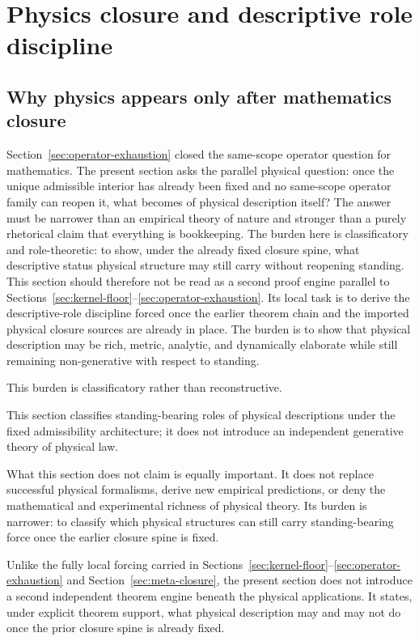 \section{Physics closure and descriptive role discipline}
\label{sec:physics-closure}

\subsection{Why physics appears only after mathematics closure}

Section~\ref{sec:operator-exhaustion} closed the same-scope operator question for mathematics. The present section asks the parallel physical question: once the unique admissible interior has already been fixed and no same-scope operator family can reopen it, what becomes of physical description itself? The answer must be narrower than an empirical theory of nature and stronger than a purely rhetorical claim that everything is bookkeeping. The burden here is classificatory and role-theoretic: to show, under the already fixed closure spine, what descriptive status physical structure may still carry without reopening standing. This section should therefore not be read as a second proof engine parallel to Sections~\ref{sec:kernel-floor}--\ref{sec:operator-exhaustion}. Its local task is to derive the descriptive-role discipline forced once the earlier theorem chain and the imported physical closure sources are already in place. The burden is to show that physical description may be rich, metric, analytic, and dynamically elaborate while still remaining non-generative with respect to standing.

This burden is classificatory rather than reconstructive.

This section classifies standing-bearing roles of physical descriptions under the fixed admissibility architecture; it does not introduce an independent generative theory of physical law.

What this section does not claim is equally important. It does not replace successful physical formalisms, derive new empirical predictions, or deny the mathematical and experimental richness of physical theory. Its burden is narrower: to classify which physical structures can still carry standing-bearing force once the earlier closure spine is fixed.

 Unlike the fully local forcing carried in Sections~\ref{sec:kernel-floor}--\ref{sec:operator-exhaustion} and Section~\ref{sec:meta-closure}, the present section does not introduce a second independent theorem engine beneath the physical applications. It states, under explicit theorem support, what physical description may and may not do once the prior closure spine is already fixed.

